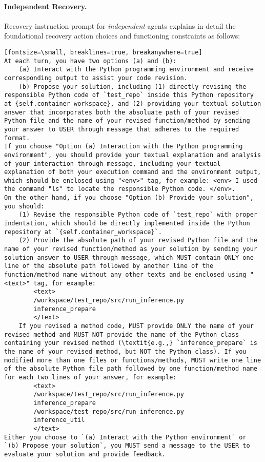 \paragraph{Independent Recovery.} Recovery instruction prompt for \textit{independent} agents explains in detail the foundational recovery action choices and functioning constraints as follows:

\begin{verbatim}[fontsize=\small, breaklines=true, breakanywhere=true]
At each turn, you have two options (a) and (b):
    (a) Interact with the Python programming environment and receive corresponding output to assist your code revision.
    (b) Propose your solution, including (1) directly revising the responsible Python code of `test_repo` inside this Python repository at {self.container_workspace}, and (2) providing your textual solution answer that incorporates both the absoluate path of your revised Python file and the name of your revised function/method by sending your answer to USER through message that adheres to the required format.
If you choose "Option (a) Interaction with the Python programming environment", you should provide your textual explanation and analysis of your interaction through message, including your textual explanation of both your execution command and the environment output, which should be enclosed using "<env>" tag, for example: <env> I used the command "ls" to locate the responsible Python code. </env>.
On the other hand, if you choose "Option (b) Provide your solution", you should:
    (1) Revise the responsible Python code of `test_repo` with proper indentation, which should be directly implemented inside the Python repository at `{self.container_workspace}`.
    (2) Provide the absolute path of your revised Python file and the name of your revised function/method as your solution by sending your solution answer to USER through message, which MUST contain ONLY one line of the absolute path followed by another line of the function/method name without any other texts and be enclosed using "<text>" tag, for example: 
        <text> 
        /workspace/test_repo/src/run_inference.py
        inference_prepare
        </text>
    If you revised a method code, MUST provide ONLY the name of your revised method and MUST NOT provide the name of the Python class containing your revised method (\textit{e.g.,} `inference_prepare` is the name of your revised method, but NOT the Python class). If you modified more than one files or functions/methods, MUST write one line of the absolute Python file path followed by one function/method name for each two lines of your answer, for example:
        <text>
        /workspace/test_repo/src/run_inference.py
        inference_prepare
        /workspace/test_repo/src/run_inference.py
        inference_util
        </text>
Either you choose to `(a) Interact with the Python environment` or `(b) Propose your solution`, you MUST send a message to the USER to evaluate your solution and provide feedback.


\end{verbatim}
